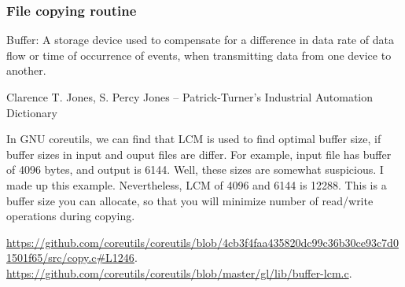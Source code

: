 \subsubsection{File copying routine}

\epigraph{Buffer: A storage device used to compensate for a difference in data rate of data flow or time of occurrence of events, when transmitting data from one device to another.}
{Clarence T. Jones, S. Percy Jones -- Patrick-Turner's Industrial Automation Dictionary}

In GNU coreutils, we can find that LCM is used to find optimal buffer size, if buffer sizes in input and ouput files are differ.
For example, input file has buffer of 4096 bytes, and output is 6144.
Well, these sizes are somewhat suspicious. I made up this example.
Nevertheless, LCM of 4096 and 6144 is 12288. This is a buffer size you can allocate, so that you will minimize number of read/write operations during copying.

\url{https://github.com/coreutils/coreutils/blob/4cb3f4faa435820dc99c36b30ce93c7d01501f65/src/copy.c#L1246}.
\url{https://github.com/coreutils/coreutils/blob/master/gl/lib/buffer-lcm.c}.

